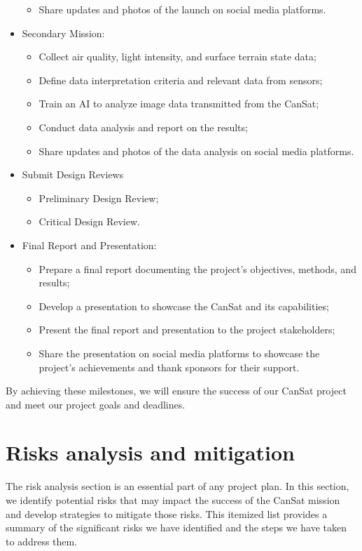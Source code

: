 \documentclass[11pt]{article}
\begin{document}
\begin{itemize}[leftmargin=1cm, itemindent=0.25cm, noitemsep, topsep=0pt, label=$\bullet$]
\begin{itemize}[label=, noitemsep, topsep=2pt]
        \item Share updates and photos of the launch on social media platforms.
    \end{itemize}
    \item Secondary Mission:
    \begin{itemize}[label=, noitemsep, topsep=2pt]
        \item Collect air quality, light intensity, and surface terrain state data;
        \item Define data interpretation criteria and relevant data from sensors;
        \item Train an AI to analyze image data transmitted from the CanSat;
        \item Conduct data analysis and report on the results;
        \item Share updates and photos of the data analysis on social media platforms.
    \end{itemize}
    \item Submit Design Reviews
    \begin{itemize}[label=, noitemsep, topsep=2pt]
        \item Preliminary Design Review;
        \item Critical Design Review.
    \end{itemize}
    \item Final Report and Presentation:
    \begin{itemize}[label=, noitemsep, topsep=2pt]
    \item Prepare a final report documenting the project's objectives, methods, and results;
    \item Develop a presentation to showcase the CanSat and its capabilities;
    \item Present the final report and presentation to the project stakeholders;
    \item Share the presentation on social media platforms to showcase the project's achievements and thank sponsors for their support.
    \end{itemize}
\end{itemize}

By achieving these milestones, we will ensure the success of our CanSat project and meet our project goals and deadlines.

\section{Risks analysis and mitigation}
The risk analysis section is an essential part of any project plan. In this section, we identify potential risks that may impact the success of the CanSat mission and develop strategies to mitigate those risks. This itemized list provides a summary of the significant risks we have identified and the steps we have taken to address them.
\end{document}
